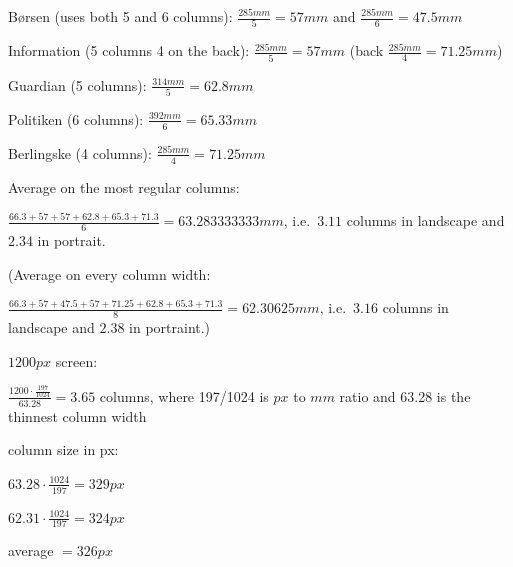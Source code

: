 Børsen (uses both 5 and 6 columns): $\frac{285mm}{5} = 57mm$ and $\frac{285mm}{6} = 47.5mm$

Information (5 columns 4 on the back): $\frac{285mm}{5} = 57mm$ (back $\frac{285mm}{4} = 71.25mm$)

Guardian (5 columns): $\frac{314mm}{5} = 62.8mm$

Politiken (6 columns): $\frac{392mm}{6} = 65.33mm$

Berlingske (4 columns): $\frac{285mm}{4} = 71.25mm$

Average on the most regular columns:

$\frac{66.3+57+57+62.8+65.3+71.3}{6} = 63.283333333mm$, i.e.\ $3.11$ columns in landscape and $2.34$ in portrait.

(Average on every column width:

$\frac{66.3+57+47.5+57+71.25+62.8+65.3+71.3}{8} = 62.30625mm$, i.e.\ $3.16$ columns in landscape and $2.38$ in portraint.)

$1200px$ screen:

$\frac{1200 \cdot \frac{197}{1024}}{63.28} = 3.65$ columns, where 197/1024 is $px$ to $mm$ ratio and 63.28 is the thinnest column width

column size in px:

$63.28 \cdot \frac{1024}{197} = 329px$

$62.31 \cdot \frac{1024}{197} = 324px$

average $= 326px$

